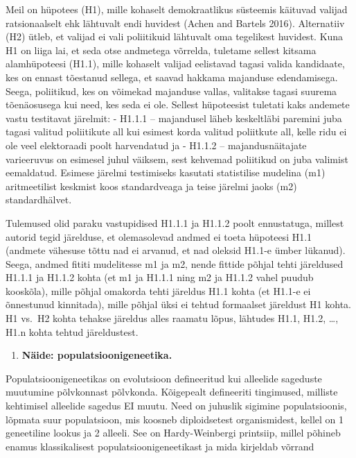 \documentclass[]{book}
\providecommand{\tightlist}{%
  \setlength{\itemsep}{0pt}\setlength{\parskip}{0pt}}
\begin{document}
Meil on hüpotees (H1), mille kohaselt demokraatlikus süsteemis käituvad
valijad ratsionaalselt ehk lähtuvalt endi huvidest (Achen and Bartels
2016). Alternatiiv (H2) ütleb, et valijad ei vali poliitikuid lähtuvalt
oma tegelikest huvidest. Kuna H1 on liiga lai, et seda otse andmetega
võrrelda, tuletame sellest kitsama alamhüpoteesi (H1.1), mille kohaselt
valijad eelistavad tagasi valida kandidaate, kes on ennast tõestanud
sellega, et saavad hakkama majanduse edendamisega. Seega, poliitikud,
kes on võimekad majanduse vallas, valitakse tagasi suurema tõenäosusega
kui need, kes seda ei ole. Sellest hüpoteesist tuletati kaks andemete
vastu testitavat järelmit: - H1.1.1 -- majandusel läheb keskeltläbi
paremini juba tagasi valitud poliitikute all kui esimest korda valitud
poliitkute all, kelle ridu ei ole veel elektoraadi poolt harvendatud ja
- H1.1.2 -- majandusnäitajate varieeruvus on esimesel juhul väiksem,
sest kehvemad poliitikud on juba valimist eemaldatud. Esimese järelmi
testimiseks kasutati statistilise mudelina (m1) aritmeetilist keskmist
koos standardveaga ja teise järelmi jaoks (m2) standardhälvet.

Tulemused olid paraku vastupidised H1.1.1 ja H1.1.2 poolt ennustatuga,
millest autorid tegid järelduse, et olemasolevad andmed ei toeta
hüpoteesi H1.1 (andmete vähesuse tõttu nad ei arvanud, et nad oleksid
H1.1-e ümber lükanud). Seega, andmed fititi mudelitesse m1 ja m2, nende
fittide põhjal tehti järeldused H1.1.1 ja H1.1.2 kohta (et m1 ja H1.1.1
ning m2 ja H1.1.2 vahel puudub kooskõla), mille põhjal omakorda tehti
järeldus H1.1 kohta (et H1.1-e ei õnnestunud kinnitada), mille põhjal
üksi ei tehtud formaalset järeldust H1 kohta. H1 vs.~H2 kohta tehakse
järeldus alles raamatu lõpus, lähtudes H1.1, H1.2, \ldots{}, H1.n kohta
tehtud järeldustest.

\begin{enumerate}
\def\labelenumi{(\arabic{enumi})}
\setcounter{enumi}{1}
\tightlist
\item
  \textbf{Näide: populatsioonigeneetika.}
\end{enumerate}

Populatsioonigeneetikas on evolutsioon defineeritud kui alleelide
sageduste muutumine põlvkonnast põlvkonda. Kõigepealt defineeriti
tingimused, milliste kehtimisel alleelide sagedus EI muutu. Need on
juhuslik sigimine populatsioonis, lõpmata suur populatsioon, mis koosneb
diploidsetest organismidest, kellel on 1 geneetiline lookus ja 2
alleeli. See on Hardy-Weinbergi printsiip, millel põhineb enamus
klassikalisest populatsioonigeneetikast ja mida kirjeldab võrrand
\end{document}
